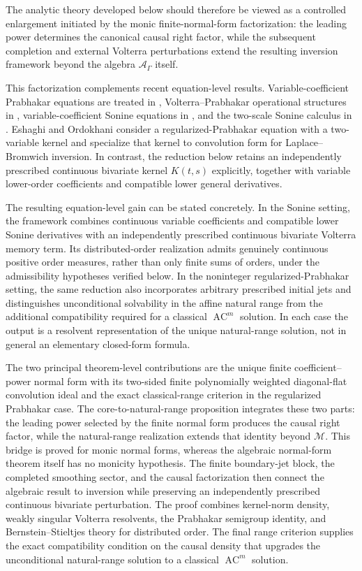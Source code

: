 \documentclass[11pt]{article}
\numberwithin{equation}{section}
\theoremstyle{definition}
\theoremstyle{remark}
\newcommand{\M}{\mathcal M}
\newcommand{\A}{\mathcal A}
\newcommand{\AC}{\operatorname{AC}}
\begin{document}
The analytic theory developed below should therefore be viewed as a controlled enlargement initiated by the monic finite-normal-form factorization: the leading power determines the canonical causal right factor, while the subsequent completion and external Volterra perturbations extend the resulting inversion framework beyond the algebra $\A_\Gamma$ itself.

This factorization complements recent equation-level results. Variable-coefficient Prabhakar equations are treated in \cite{FernandezRestrepo2022}, Volterra--Prabhakar operational structures in \cite{Tomovski2026}, variable-coefficient Sonine equations in \cite{Guzoglu2026}, and the two-scale Sonine calculus in \cite{Colombaro2026}. Eshaghi and Ordokhani \cite{Eshaghi2021} consider a regularized-Prabhakar equation with a two-variable kernel and specialize that kernel to convolution form for Laplace--Bromwich inversion. In contrast, the reduction below retains an independently prescribed continuous bivariate kernel $K(t,s)$ explicitly, together with variable lower-order coefficients and compatible lower general derivatives.

The resulting equation-level gain can be stated concretely. In the Sonine setting, the framework combines continuous variable coefficients and compatible lower Sonine derivatives with an independently prescribed continuous bivariate Volterra memory term. Its distributed-order realization admits genuinely continuous positive order measures, rather than only finite sums of orders, under the admissibility hypotheses verified below. In the noninteger regularized-Prabhakar setting, the same reduction also incorporates arbitrary prescribed initial jets and distinguishes unconditional solvability in the affine natural range from the additional compatibility required for a classical $\AC^m$ solution. In each case the output is a resolvent representation of the unique natural-range solution, not in general an elementary closed-form formula.

The two principal theorem-level contributions are the unique finite coefficient--power normal form with its two-sided finite polynomially weighted diagonal-flat convolution ideal and the exact classical-range criterion in the regularized Prabhakar case. The core-to-natural-range proposition integrates these two parts: the leading power selected by the finite normal form produces the causal right factor, while the natural-range realization extends that identity beyond $\M$. This bridge is proved for monic normal forms, whereas the algebraic normal-form theorem itself has no monicity hypothesis. The finite boundary-jet block, the completed smoothing sector, and the causal factorization then connect the algebraic result to inversion while preserving an independently prescribed continuous bivariate perturbation. The proof combines kernel-norm density, weakly singular Volterra resolvents, the Prabhakar semigroup identity, and Bernstein--Stieltjes theory for distributed order. The final range criterion supplies the exact compatibility condition on the causal density that upgrades the unconditional natural-range solution to a classical $\AC^m$ solution.
\end{document}
